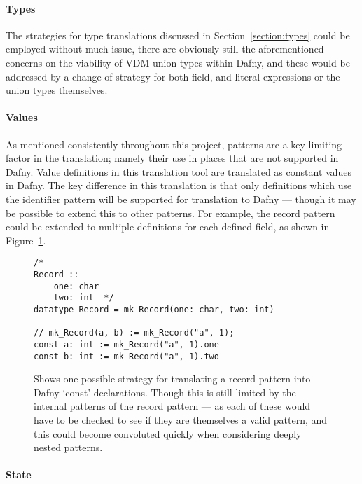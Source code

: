 \documentclass{entcs}
\begin{document}
\paragraph{Types} 

The strategies for type translations discussed in Section~\ref{section:types} could be employed without much issue, there are obviously still the aforementioned concerns on the viability of VDM union types within Dafny, and these would be addressed by a change of strategy for both field, and literal expressions or the union types themselves.

\paragraph{Values} 

As mentioned consistently throughout this project, patterns are a key limiting factor in the translation; namely their use in places that are not supported in Dafny. Value definitions in this translation tool are translated as constant values in Dafny. The key difference in this translation is that only definitions which use the identifier pattern will be supported for translation to Dafny --- though it may be possible to extend this to other patterns. For example, the record pattern could be extended to multiple definitions for each defined field, as shown in Figure~\ref{fig:const_pattern}.

\begin{figure}[h]
	\begin{center}
        \begin{lstlisting}[language=Dafny]
/*
Record :: 
    one: char 
    two: int  */
datatype Record = mk_Record(one: char, two: int)

// mk_Record(a, b) := mk_Record("a", 1);
const a: int := mk_Record("a", 1).one
const b: int := mk_Record("a", 1).two
        \end{lstlisting}
		\caption{Shows one possible strategy for translating a record pattern into Dafny `const' declarations. Though this is still limited by the internal patterns of the record pattern --- as each of these would have to be checked to see if they are themselves a valid pattern, and this could become convoluted quickly when considering deeply nested patterns.}\label{fig:const_pattern}
	\end{center}
\end{figure}

\paragraph{State} 
\end{document}
